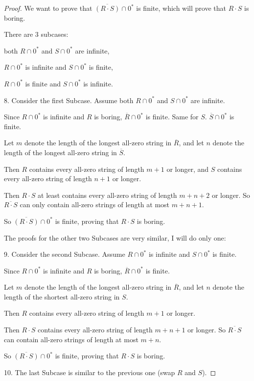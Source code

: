 \documentclass[14pt]{extarticle}
\begin{document}
\begin{proof}
We want to prove that $\overline{(R \cdot S)} \cap 0^*$ is finite, which will prove that $R \cdot S$ is boring.

There are 3 subcases: 

both $R \cap 0^*$ and $S \cap 0^*$ are infinite,

$R \cap 0^*$ is infinite and $S \cap 0^*$ is finite, 

$R \cap 0^*$ is finite and $S \cap 0^*$ is infinite.

8. Consider the first Subcase. Assume both $R \cap 0^*$ and $S \cap 0^*$ are infinite.

Since $R \cap 0^*$ is infinite and $R$ is boring, $\overline{R} \cap 0^*$ is finite. Same for $S$. $\overline{S} \cap 0^*$ is finite.

Let $m$ denote the length of the longest all-zero string in $\overline{R}$, and let $n$ denote the length of the longest all-zero string in $\overline{S}$. 

Then $R$ contains every all-zero string of length $m+1$ or longer, and $S$ contains every all-zero string of length $n+1$ or longer.

Then $R \cdot S$ at least contains every all-zero string of length $m+n+2$ or longer. So $\overline{R \cdot S}$ can only contain all-zero strings of length at most $m+n+1$.

So $\overline{(R \cdot S)} \cap 0^*$ is finite, proving that $R\cdot S$ is boring.

The proofs for the other two Subcases are very similar, I will do only one:

9. Consider the second Subcase. Assume $R \cap 0^*$ is infinite and $S \cap 0^*$ is finite.

Since $R \cap 0^*$ is infinite and $R$ is boring, $\overline{R} \cap 0^*$ is finite.

Let $m$ denote the length of the longest all-zero string in $\overline{R}$, and let $n$ denote the length of the shortest all-zero string in $S$.

Then $R$ contains every all-zero string of length $m+1$ or longer.

Then $R \cdot S$ contains every all-zero string of length $m+n+1$ or longer. So $\overline{R \cdot S}$ can contain all-zero strings of length at most $m+n$.

So $\overline{(R \cdot S)} \cap 0^*$ is finite, proving that $R\cdot S$ is boring.

10. The last Subcase is similar to the previous one (swap $R$ and $S$).
\end{proof}
\end{document}

